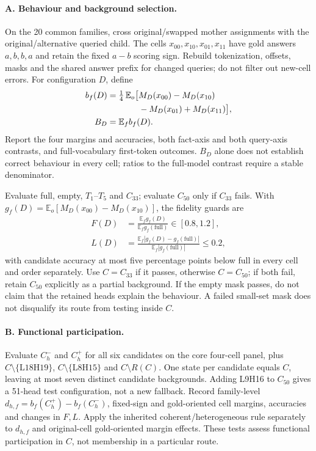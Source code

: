 \paragraph{A. Behaviour and background selection.}
On the 20 common families, cross original/swapped mother assignments with the
original/alternative queried child. The cells $x_{00},x_{10},x_{01},x_{11}$ have
gold answers $a,b,b,a$ and retain the fixed $a-b$ scoring sign. Rebuild
tokenization, offsets, masks and the shared answer prefix for changed queries;
do not filter out new-cell errors. For configuration $D$, define
\begin{align}
b_f(D)&=\tfrac14\,\mathbb{E}_o\bigl[
 M_D(x_{00})-M_D(x_{10}) \notag\\
&\hspace{3.7em}{}-M_D(x_{01})+M_D(x_{11})\bigr], \notag\\
B_D&=\mathbb{E}_f b_f(D). \label{eq:bd}
\end{align}
Report the four margins and accuracies, both fact-axis and both query-axis
contrasts, and full-vocabulary first-token outcomes. $B_D$ alone does not establish
correct behaviour in every cell; ratios to the full-model contrast require a
stable denominator.

Evaluate full, empty, $T_1$--$T_5$ and $C_{33}$; evaluate $C_{50}$ only if
$C_{33}$ fails. With
$g_f(D)=\mathbb{E}_o[M_D(x_{00})-M_D(x_{10})]$, the fidelity guards are
\begin{align*}
F(D)&=\frac{\mathbb{E}_f g_f(D)}{\mathbb{E}_f g_f(\mathrm{full})}
       \in[0.8,1.2],\\
L(D)&=\frac{\mathbb{E}_f|g_f(D)-g_f(\mathrm{full})|}
           {\mathbb{E}_f|g_f(\mathrm{full})|}\le0.2,
\end{align*}
with candidate accuracy at most five percentage points below full in every cell
and order separately. Use $C=C_{33}$ if it passes, otherwise $C=C_{50}$; if
both fail, retain $C_{50}$ explicitly as a partial background. If the empty mask
passes, do not claim that the retained heads explain the behaviour. A failed
small-set mask does not disqualify its route from testing inside $C$.

\paragraph{B. Functional participation.}
Evaluate $C_h^-$ and $C_h^+$ for all six candidates on the core four-cell panel,
plus $C\setminus\{\mathrm{L18H19}\}$,
$C\setminus\{\mathrm{L8H15}\}$ and $C\setminus R(C)$.
One state per candidate equals $C$, leaving at most seven distinct candidate
backgrounds. Adding L9H16 to $C_{50}$ gives a 51-head test configuration, not a new
fallback. Record family-level $d_{h,f}=b_f(C_h^+)-b_f(C_h^-)$,
fixed-sign and gold-oriented cell margins, accuracies and changes in $F,L$.
Apply the inherited coherent/heterogeneous rule separately to $d_{h,f}$ and
original-cell gold-oriented margin effects. These tests assess functional
participation in $C$, not membership in a particular route.

